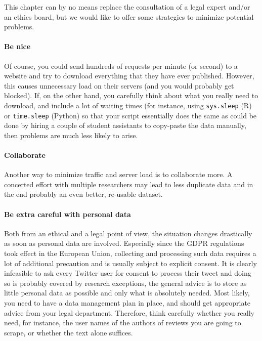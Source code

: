 This chapter can by no means replace the consultation of a legal
expert and/or an ethics board, but we would like to offer some
strategies to minimize potential problems.

\paragraph{Be nice} Of course, you could send hundreds of requests per minute (or second) to a website and try to download everything that they have ever published. However, this causes unnecessary load on their servers (and you would probably  get blocked). If, on the other hand, you carefully think about what you really need to download, and include a lot of waiting times (for instance, using \texttt{sys.sleep} (R) or \texttt{time.sleep} (Python) so that your script essentially does the same as could be done by hiring a couple of student assistants to copy-paste the data manually, then problems are much less likely to arise.

\paragraph{Collaborate} Another way to minimize traffic and server load is to collaborate more. A concerted effort with multiple researchers may lead to less duplicate data and in the end probably an even better, re-usable dataset.

\paragraph{Be extra careful with personal data} Both from an ethical and a legal point of view, the situation changes drastically as soon as personal data are involved. Especially since the GDPR regulations took effect in the European Union, collecting and processing such data requires a lot of additional precaution and is usually subject to explicit consent. It is clearly infeasible to ask every Twitter user  for consent to process their tweet and doing so is probably covered by research exceptions, the general advice is to store as little personal data as possible and only what is absolutely needed. Most likely, you need to have a data management plan in place, and should get appropriate  advice from your legal department. Therefore, think carefully whether you really need, for instance, the user names of the authors of reviews you are going to scrape, or whether the text alone suffices.

